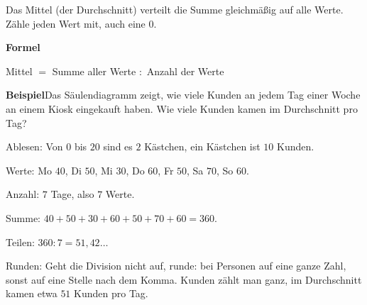 \documentclass[11pt]{article}
\makeatletter
\newlength{\kr}
\newcommand{\karomerk}[2]{\protected@write\@auxout{}{\string\karoseite{#1}{#2}{\thepage}}}
\newcommand{\karoseite}[3]{\expandafter\xdef\csname karo@#1@#2\endcsname{#3}}
\makeatother
\begin{document}
\medskip
\par\vspace{3mm}\setlength{\kr}{\dimexpr\pagegoal-\pagetotal-10mm\relax}%
\ifdim\kr>12mm\karomerk{k}{B}\noindent{\scriptsize\color{mbgrau}Platz zum Rechnen}\par\nointerlineskip\vspace{1mm}\noindent
\begin{tikzpicture}\clip (0,0) rectangle ({\linewidth-0.5mm},\kr);\draw[black!16,line width=0.3pt,step=5mm] (0,0) grid (\linewidth,\kr);\end{tikzpicture}\fi\par
\clearpage\label{s:C}\noindent\colorbox{black!12}{}\hspace{3mm}{\Large\bfseries Arithmetisches Mittel}\par\smallskip
\noindent Das Mittel (der Durchschnitt) verteilt die Summe gleichmäßig auf alle Werte. Zähle jeden Wert mit, auch eine $0$.\par\medskip
\noindent\textbf{Formel}\par\nopagebreak\noindent\hspace*{4mm}\begin{minipage}{\dimexpr\linewidth-4mm\relax}Mittel $=$ Summe aller Werte $:$ Anzahl der Werte\end{minipage}\par\medskip
\noindent\textbf{Beispiel}\quad Das Säulendiagramm zeigt, wie viele Kunden an jedem Tag einer Woche an einem Kiosk eingekauft haben. Wie viele Kunden kamen im Durchschnitt pro Tag?\par\smallskip
\noindent\begin{minipage}[t]{0.6\linewidth}\vspace{0pt}\par\noindent{}Ablesen: Von $0$ bis $20$ sind es $2$ Kästchen, ein Kästchen ist $10$ Kunden.\par\smallskip\par\noindent{}Werte: Mo $40$, Di $50$, Mi $30$, Do $60$, Fr $50$, Sa $70$, So $60$.\par\smallskip\par\noindent{}Anzahl: $7$ Tage, also $7$ Werte.\par\smallskip\par\noindent{}Summe: $40 + 50 + 30 + 60 + 50 + 70 + 60 = 360$.\par\smallskip\par\noindent{}Teilen: $360 : 7 = 51{,}42\ldots$\par\smallskip\par\noindent{}Runden: Geht die Division nicht auf, runde: bei Personen auf eine ganze Zahl, sonst auf eine Stelle nach dem Komma. Kunden zählt man ganz, im Durchschnitt kamen etwa $51$ Kunden pro Tag.\par\smallskip\end{minipage}\hfill
\end{document}

